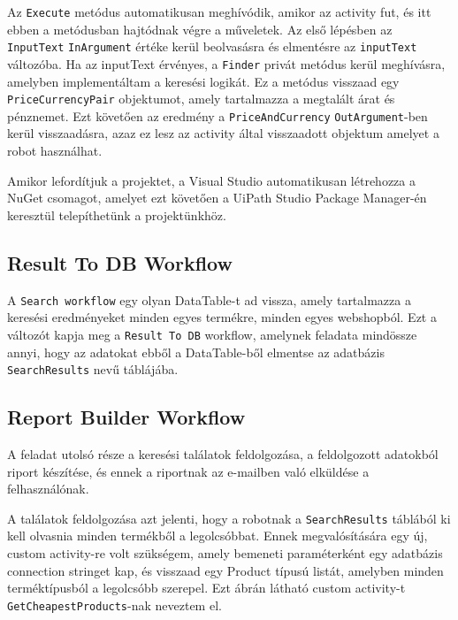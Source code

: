 \documentclass[
]{thesis-ekf}
\theoremstyle{definition}
\theoremstyle{remark}
\begin{document}
Az \texttt{Execute} metódus automatikusan meghívódik, amikor az activity fut, és itt ebben a metódusban hajtódnak végre a műveletek. Az első lépésben az \texttt{InputText} \texttt{InArgument} értéke kerül beolvasásra és elmentésre az \texttt{inputText} változóba. Ha az inputText érvényes, a \texttt{Finder} privát metódus kerül meghívásra, amelyben implementáltam a keresési logikát. Ez a metódus visszaad egy \texttt{PriceCurrencyPair} objektumot, amely tartalmazza a megtalált árat és pénznemet. Ezt követően az eredmény a \texttt{PriceAndCurrency} \texttt{OutArgument}-ben kerül visszaadásra, azaz ez lesz az activity által visszaadott objektum amelyet a robot használhat.



Amikor lefordítjuk a projektet, a Visual Studio automatikusan létrehozza a NuGet csomagot, amelyet ezt követően a UiPath Studio Package Manager-én keresztül telepíthetünk a projektünkhöz.

\subsection{Result To DB Workflow}
A \texttt{Search workflow} egy olyan DataTable-t ad vissza, amely tartalmazza a keresési eredményeket minden egyes termékre, minden egyes webshopból. Ezt a változót kapja meg a \texttt{Result To DB} workflow, amelynek feladata mindössze annyi, hogy az adatokat ebből a DataTable-ből elmentse az adatbázis \texttt{SearchResults} nevű táblájába.

\subsection{Report Builder Workflow}
A feladat utolsó része a keresési találatok feldolgozása, a feldolgozott adatokból riport készítése, és ennek a riportnak az e-mailben való elküldése a felhasználónak. 

A találatok feldolgozása azt jelenti, hogy a robotnak a \texttt{SearchResults} táblából ki kell olvasnia minden termékből a legolcsóbbat. Ennek megvalósítására egy új, custom activity-re volt szükségem, amely bemeneti paraméterként egy adatbázis  connection stringet kap, és visszaad egy Product típusú listát, amelyben minden terméktípusból a legolcsóbb szerepel. Ezt  ábrán látható custom activity-t \texttt{GetCheapestProducts}-nak neveztem el.
\end{document}

